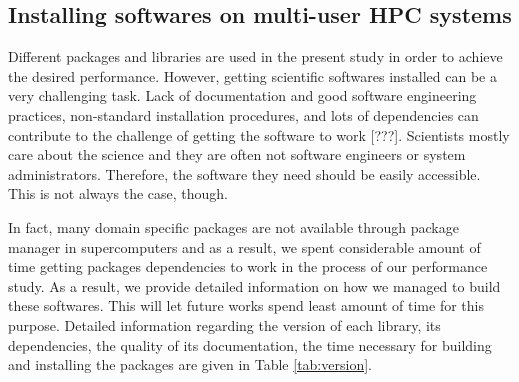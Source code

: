 \subsection{Installing softwares on multi-user HPC systems}
Different packages and libraries are used in the present study in order to achieve the desired performance. 
However, getting scientific softwares installed can be a very challenging task.
Lack of documentation and good software engineering practices, non-standard installation procedures, and lots of dependencies can contribute to the challenge of getting the software to work [???].
Scientists mostly care about the science and they are often not software engineers or system administrators. 
Therefore, the software they need should be easily accessible. 
This is not always the case, though.

In fact, many domain specific packages are not available through package manager in supercomputers and as a result,
we spent considerable amount of time getting packages dependencies to work in the process of our performance study. 
As a result, we provide detailed information on how we managed to build these softwares.
This will let future works spend least amount of time for this purpose. 
Detailed information regarding the version of each library, its dependencies, the quality of its documentation, the time necessary for building and installing the packages are given in Table \ref{tab:version}. 

